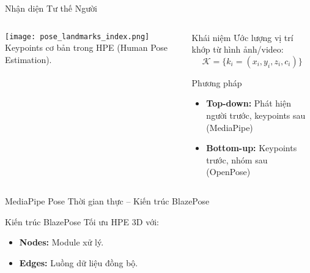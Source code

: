 \begin{frame}{Nhận diện Tư thế Người}
\begin{columns}[T]
    \begin{column}{0.45\textwidth}
        \centering
        \texttt{[image: pose\_landmarks\_index.png]}
        \vspace{0.2cm}
        {\small Keypoints cơ bản trong HPE (Human Pose Estimation).}
    \end{column}

    \begin{column}{0.55\textwidth}
        \begin{block}{Khái niệm}
            Ước lượng vị trí khớp từ hình ảnh/video:
            \[
                \mathcal{K} = \{k_i = (x_i, y_i, z_i, c_i)\}
            \]
        \end{block}

        \begin{alertblock}{Phương pháp}
            \begin{itemize}
                \item \textbf{Top-down:} Phát hiện người trước, keypoints sau (MediaPipe)
                \item \textbf{Bottom-up:} Keypoints trước, nhóm sau (OpenPose)
            \end{itemize}
        \end{alertblock}
    \end{column}
\end{columns}
\end{frame}


\begin{frame}{MediaPipe Pose Thời gian thực – Kiến trúc BlazePose}
    \begin{block}{Kiến trúc BlazePose}
        Tối ưu HPE 3D với:
        \begin{itemize}
            \item \textbf{Nodes:} Module xử lý.
            \item \textbf{Edges:} Luồng dữ liệu đồng bộ.
        \end{itemize}
    \end{block}
\end{frame}

